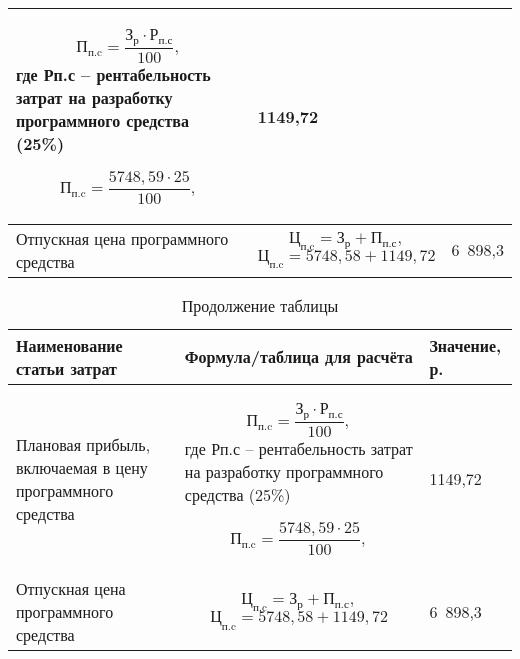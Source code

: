 \begin{table}[H]
\begin{tabular}{|p{5cm}|p{7cm}|p{3cm}|}
		\begin{equation}
			\mathrm{П_{п.c}} = \frac{\mathrm{З_{р}} \cdot \mathrm{Р_{п.с}}}{100},
		\end{equation}
		где Рп.с – рентабельность затрат на разработку программного средства (25\%)
		
		\[	\mathrm{П_{п.c}} = \frac{5748,59 \cdot 25}{100}, \]
		
		& 1149,72   \\
		\hline
		Отпускная цена программного
		средства & 
		\begin{equation}
			\mathrm{Ц_{п.c}} = {\mathrm{З_{р}} + \mathrm{П_{п.с}}},
		\end{equation}
		\[	\mathrm{Ц_{п.c}} = {5748,58} + {1149,72} \]
		& 6 898,3  \\
		\hline
		
	\end{tabular}
	
\end{table}

\newpage

\begin{table}[H]
	\caption{Продолжение таблицы}
	\centering 
	\begin{tabular}{|p{5cm}|p{7cm}|p{3cm}|}
		\hline 
		Наименование статьи затрат  & Формула/таблица для расчёта & Значение, р. \\   
		\hline 
		Плановая прибыль, включаемая в
		цену программного средства  & 
		
		\begin{equation}
			\mathrm{П_{п.c}} = \frac{\mathrm{З_{р}} \cdot \mathrm{Р_{п.с}}}{100},
		\end{equation}
		где Рп.с – рентабельность затрат на разработку программного средства (25\%)
			
				\[	\mathrm{П_{п.c}} = \frac{5748,59 \cdot 25}{100}, \]
		
		& 1149,72   \\
		\hline
		Отпускная цена программного
		средства & 
		\begin{equation}
			\mathrm{Ц_{п.c}} = {\mathrm{З_{р}} + \mathrm{П_{п.с}}},
		\end{equation}
		\[	\mathrm{Ц_{п.c}} = {5748,58} + {1149,72} \]
		 & 6 898,3  \\
		\hline
		
		
		
	\end{tabular}
	
\end{table}


